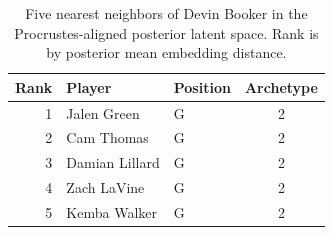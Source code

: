 \begin{table}[htbp]
  \centering\small
  \begin{tabular}{rllc}
    \toprule
    Rank & Player & Position & Archetype \\
    \midrule
    1 & Jalen Green & G & 2 \\
    2 & Cam Thomas & G & 2 \\
    3 & Damian Lillard & G & 2 \\
    4 & Zach LaVine & G & 2 \\
    5 & Kemba Walker & G & 2 \\
    \bottomrule
  \end{tabular}
  \caption{Five nearest neighbors of Devin Booker in the Procrustes-aligned posterior latent space. Rank is by posterior mean embedding distance.}
  \label{tab:Devin_Booker_neighbors}
\end{table}

